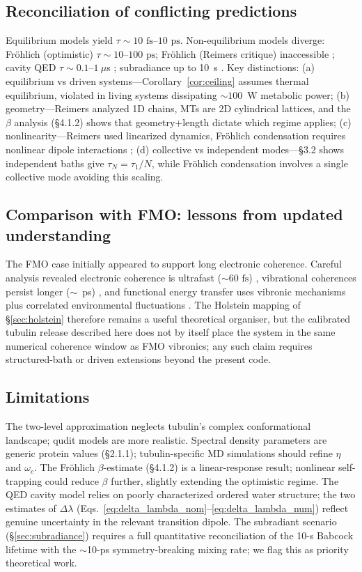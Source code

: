 \documentclass[twocolumn,10pt]{article}
\newcommand{\ps}{\text{~ps}}
\newcommand{\fs}{\text{~fs}}
\begin{document}
\subsection{Reconciliation of conflicting predictions}
Equilibrium models \cite{Tegmark2000,Hagan2002,Xiang2019} yield
$\tau \sim 10\fs\text{--}10\ps$. Non-equilibrium models diverge: Fr\"ohlich
(optimistic) $\tau \sim 10\text{--}100\ps$; Fr\"ohlich (Reimers critique)
inaccessible \cite{Reimers2009}; cavity QED $\tau \sim 0.1\text{--}1~\mu$s
\cite{Mavromatos2025}; subradiance up to 10~s \cite{Babcock2024}.
Key distinctions: (a) equilibrium vs driven systems---Corollary~\ref{cor:ceiling}
assumes thermal equilibrium, violated in living systems dissipating
$\sim 100$~W metabolic power; (b) geometry---Reimers \cite{Reimers2009}
analyzed 1D chains, MTs are 2D cylindrical lattices, and the $\beta$
analysis (\S 4.1.2) shows that geometry+length dictate which regime
applies; (c) nonlinearity---Reimers used linearized dynamics, Fr\"ohlich
condensation requires nonlinear dipole interactions \cite{Pokorn2011};
(d) collective vs independent modes---\S 3.2 shows independent baths give
$\tau_N = \tau_1/N$, while Fr\"ohlich condensation involves a single
collective mode avoiding this scaling.

\subsection{Comparison with FMO: lessons from updated understanding}
The FMO case initially appeared to support long electronic coherence.
Careful analysis revealed electronic coherence is ultrafast ($\sim 60\fs$)
\cite{Duan2017,Thyrhaug2018}, vibrational coherences persist longer
($\sim$~ps) \cite{Thyrhaug2018}, and functional energy transfer uses
vibronic mechanisms plus correlated environmental fluctuations
\cite{Dean2017,Cao2020,Chin2013}. The Holstein mapping of
\S\ref{sec:holstein} therefore remains a useful theoretical organiser, but
the calibrated tubulin release described here does not by itself place the
system in the same numerical coherence window as FMO vibronics; any such
claim requires structured-bath or driven extensions beyond the present code.

\subsection{Limitations}
The two-level approximation neglects tubulin's complex conformational
landscape; qudit models \cite{Mavromatos2025} are more realistic. Spectral
density parameters are generic protein values (\S 2.1.1); tubulin-specific
MD simulations should refine $\eta$ and $\omega_c$. The Fr\"ohlich
$\beta$-estimate (\S 4.1.2) is a linear-response result; nonlinear
self-trapping could reduce $\beta$ further, slightly extending the
optimistic regime. The QED cavity model relies on poorly characterized
ordered water structure; the two estimates of $\Delta\lambda$
(Eqs.~\ref{eq:delta_lambda_nom}--\ref{eq:delta_lambda_num}) reflect
genuine uncertainty in the relevant transition dipole. The subradiant
scenario (\S\ref{sec:subradiance}) requires a full quantitative
reconciliation of the 10-s Babcock lifetime with the
$\sim$10-ps symmetry-breaking mixing rate; we flag this as priority
theoretical work.
\end{document}
